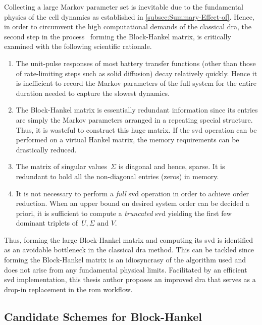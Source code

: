 Collecting a  large Markov parameter  set is  inevitable due to  the fundamental
physics of the cell  dynamics as established in \cref{subsec:Summary-Effect-of}.
Hence, in  order to circumvent the  high computational demands of  the classical
\gls{dra}, the second step in the process \ie~forming the Block-Hankel matrix,
is critically examined with the following scientific rationale.

\begin{enumerate}
	\item
        The unit-pulse responses of most  battery transfer functions (other than
        those of rate-limiting  steps such as solid  diffusion) decay relatively
        quickly. Hence it is inefficient to  record the Markov parameters of the
        full  system for  the  entire  duration needed  to  capture the  slowest
        dynamics.
	\item
        The Block-Hankel  matrix is essentially redundant  information since its
        entries are simply the Markov parameters arranged in a repeating special
        structure. Thus,  it is wasteful to  construct this huge matrix.  If the
        \gls{svd} operation  can be  performed on a  virtual Hankel  matrix, the
        memory requirements can be drastically reduced.
	\item
        The matrix of singular values~$\Sigma$ is diagonal and hence, sparse. It
        is redundant to hold all the non-diagonal entries (zeros) in memory.
	\item
        It  is not  necessary to  perform a  \emph{full} \gls{svd}  operation in
        order  to  achieve order  reduction.  When  an  upper bound  on  desired
        system order  can be  decided a  priori, it is  sufficient to  compute a
        \emph{truncated}  \gls{svd} yielding  the  first  few dominant  triplets
        of~${U, \Sigma \text{ and } V}$.
\end{enumerate}
Thus,  forming the  large Block-Hankel  matrix  and computing  its \gls{svd}  is
identified as an avoidable bottleneck in the classical \gls{dra} method. This can
be  tackled since  forming the  Block-Hankel matrix  is an  idiosyncrasy of  the
algorithm  used  and  does  not  arise from  any  fundamental  physical  limits.
Facilitated  by  an  efficient  \gls{svd}  implementation,  this  thesis  author
proposes  an improved  \gls{dra} that  serves  as a  drop-in  replacement in  the
\gls{rom} workflow.

\subsection{Candidate Schemes for Block-Hankel }

